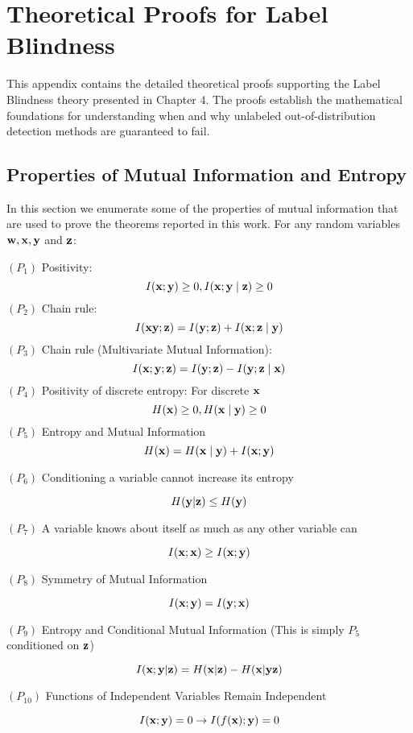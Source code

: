 \chapter{Theoretical Proofs for Label Blindness}
\label{app:proofs}

This appendix contains the detailed theoretical proofs supporting the Label Blindness theory presented in Chapter 4. The proofs establish the mathematical foundations for understanding when and why unlabeled out-of-distribution detection methods are guaranteed to fail.

\section{Properties of Mutual Information and Entropy}
\label{app:properties}

In this section we enumerate some of the properties of mutual information that are used to prove the theorems reported in this work. For any random variables ${\mathbf{w}}, {\mathbf{x}}, {\mathbf{y}}$ and ${\mathbf{z}}$:

$\left(P_1\right)$ Positivity:
$$
I({\mathbf{x}} ; {\mathbf{y}}) \geq 0, I({\mathbf{x}} ; {\mathbf{y}} \mid {\mathbf{z}}) \geq 0
$$
$\left(P_2\right)$ Chain rule:
$$
I({\mathbf{x}} {\mathbf{y}} ; {\mathbf{z}})=I({\mathbf{y}} ; {\mathbf{z}})+I({\mathbf{x}} ; {\mathbf{z}} \mid {\mathbf{y}})
$$
$\left(P_3\right)$ Chain rule (Multivariate Mutual Information):
$$
I({\mathbf{x}} ; {\mathbf{y}} ; {\mathbf{z}})=I({\mathbf{y}} ; {\mathbf{z}})-I({\mathbf{y}} ; {\mathbf{z}} \mid {\mathbf{x}})
$$
$\left(P_4\right)$ Positivity of discrete entropy:
For discrete ${\mathbf{x}}$
$$
H({\mathbf{x}}) \geq 0, H({\mathbf{x}} \mid {\mathbf{y}}) \geq 0
$$
$\left(P_5\right)$ Entropy and Mutual Information
$$
H({\mathbf{x}})=H({\mathbf{x}} \mid {\mathbf{y}})+I({\mathbf{x}} ; {\mathbf{y}})
$$

$(P_6)$ Conditioning a variable cannot increase its entropy

$$
H({\mathbf{y}}|{\mathbf{z}}) \leq H({\mathbf{y}})
$$

$(P_7)$ A variable knows about itself as much as any other variable can

$$
I({\mathbf{x}};{\mathbf{x}}) \geq I({\mathbf{x}};{\mathbf{y}})
$$

$(P_8)$ Symmetry of Mutual Information

$$
I({\mathbf{x}};{\mathbf{y}}) = I({\mathbf{y}};{\mathbf{x}})
$$

$(P_9)$ Entropy and Conditional Mutual Information (This is simply $P_5$ conditioned on ${\mathbf{z}}$)

$$
I({\mathbf{x}};{\mathbf{y}}|{\mathbf{z}})  = H({\mathbf{x}}|{\mathbf{z}}) - H({\mathbf{x}}|{\mathbf{y}}{\mathbf{z}})
$$

$(P_{10})$ Functions of Independent Variables Remain Independent

$$
I({\mathbf{x}}; {\mathbf{y}}) = 0 \rightarrow I(f({\mathbf{x}});{\mathbf{y}}) = 0
$$

